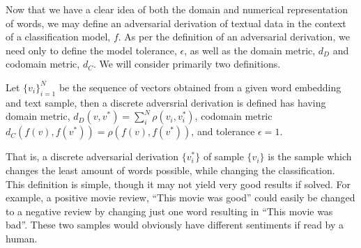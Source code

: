 \noindent
Now that we have a clear idea of both the domain and numerical representation of words, we may define an adversarial derivation of textual data in the context of a classification model, $f$.  As per the definition of an adversarial derivation, we need only to define the model tolerance, $\epsilon$, as well as the domain metric, $d_D$ and codomain metric, $d_C$.  We will consider primarily two definitions.

\begin{definition}
Let $\{v_i\}_{i=1}^N$ be the sequence of vectors obtained from a given word embedding and text sample, then a discrete adversrial derivation is defined has having domain metric, $d_D(v,v^*) = \sum_i^N\rho(v_i,v_i^*)$, codomain metric $d_C(f(v),f(v^*)) = \rho(f(v),f(v^*))$, and tolerance $\epsilon = 1$.
\end{definition}

That is, a discrete adversarial derivation $\{v_i^*\}$ of sample $\{v_i\}$ is the sample which changes the least amount of words possible, while changing the classification.  This definition is simple, though it may not yield very good results if solved.  For example, a positive movie review, ``This movie was good'' could easily be changed to a negative review by changing just one word resulting in ``This movie was bad''.  These two samples would obviously have different sentiments if read by a human.




